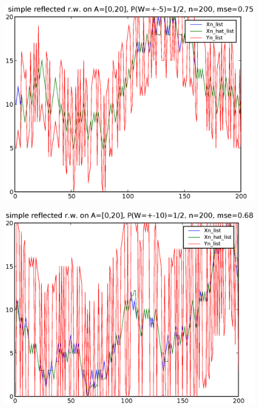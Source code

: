 \documentclass[a4paper,10pt]{article}
\begin{document}
\begin{figure}[p]
\includegraphics[width=1\textwidth]{hw5_1_K_20_L_5_n_200.eps}
\caption{}
\end{figure}

\begin{figure}
\includegraphics[width=1\textwidth]{hw5_1_K_20_L_10_n_200.eps}
\caption{}
\end{figure}
\end{document}
